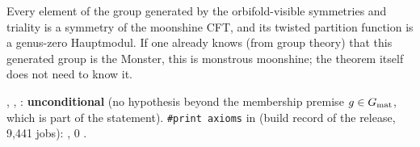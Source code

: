 \begin{physics}
Every element of the group generated by the orbifold-visible symmetries and triality is a symmetry of the moonshine CFT,
and its twisted partition function is a genus-zero Hauptmodul.  If one already knows (from group theory) that this
generated group is the Monster, this is monstrous moonshine; the theorem itself does not need to know it.
\end{physics}
\begin{status}
, , : \textbf{unconditional} (no
hypothesis beyond the membership premise $g\in G_{\mathrm{mat}}$, which is part of the statement).
\texttt{\#print axioms} in  (build record of the release, 9,441 jobs):
, $0$ .
\end{status}

